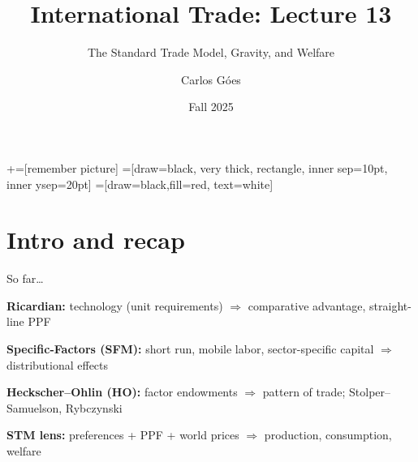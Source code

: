 \documentclass[notes,11pt, aspectratio=169, xcolor=table]{beamer}
\title[]{International Trade: Lecture 13}
\subtitle[]{The Standard Trade Model, Gravity, and Welfare}
\author[Góes]
{Carlos Góes\inst{1}}
\date{Fall 2025}
\institute[GWU]{\inst{1} George Washington University }
\newenvironment{wideitemize}{\itemize\addtolength{\itemsep}{10pt}}{\enditemize}
\begin{document}
\newcommand\marktopleft[1]{%
    \tikz[overlay,remember picture] 
        \node (marker-#1-a) at (-.3em,.3em) {};%
}
\newcommand\markbottomright[2]{%
    \tikz[overlay,remember picture] 
        \node (marker-#1-b) at (0em,0em) {};%
}
+=[remember picture] 
 =[draw=black, very thick, rectangle, inner sep=10pt, inner ysep=20pt]
 =[draw=black,fill=red, text=white]















\frame{\titlepage}
\addtocounter{framenumber}{-1}




\section{Intro and recap}

\begin{frame}{So far\ldots}
\begin{wideitemize}
  \item \textbf{Ricardian:} technology (unit requirements) $\Rightarrow$ comparative advantage, straight-line PPF
  \item \textbf{Specific-Factors (SFM):} short run, mobile labor, sector-specific capital $\Rightarrow$ distributional effects
  \item \textbf{Heckscher–Ohlin (HO):} factor endowments $\Rightarrow$ pattern of trade; Stolper–Samuelson, Rybczynski
  \item \textbf{STM lens:} preferences + PPF + world prices $\Rightarrow$ production, consumption, welfare
\end{wideitemize}
\end{frame}
\end{document}
